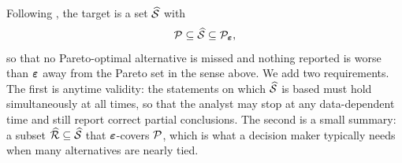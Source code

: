 Following \citet{auer2016}, the target is a set $\widehat{\mathcal{S}}$ with
\begin{equation}\label{eq:target}
\mathcal{P}\subseteq\widehat{\mathcal{S}}\subseteq\mathcal{P}_{\bm{\varepsilon}} ,
\end{equation}
so that no Pareto-optimal alternative is missed and nothing reported is worse than $\bm{\varepsilon}$ away from the Pareto set in the sense above. We add two requirements. The first is anytime validity: the statements on which $\widehat{\mathcal{S}}$ is based must hold simultaneously at all times, so that the analyst may stop at any data-dependent time and still report correct partial conclusions. The second is a small summary: a subset $\widehat{\mathcal{R}}\subseteq\widehat{\mathcal{S}}$ that $\bm{\varepsilon}$-covers $\mathcal{P}$, which is what a decision maker typically needs when many alternatives are nearly tied.

